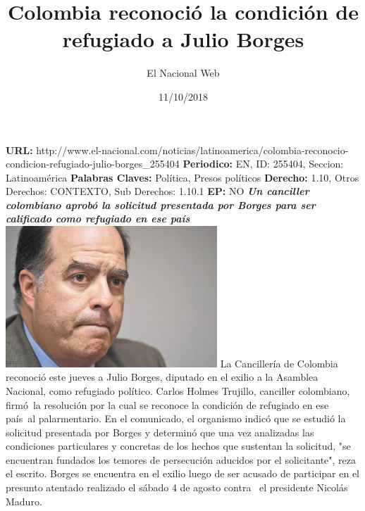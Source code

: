 \documentclass{article}%
\title{\textbf{Colombia reconoció la condición de refugiado a Julio Borges}}%
\author{El Nacional Web}%
\date{11/10/2018}%
\begin{document}
%
\normalsize%
\maketitle%
\textbf{URL: }%
http://www.el{-}nacional.com/noticias/latinoamerica/colombia{-}reconocio{-}condicion{-}refugiado{-}julio{-}borges\_255404\newline%
%
\textbf{Periodico: }%
EN, %
ID: %
255404, %
Seccion: %
Latinoamérica\newline%
%
\textbf{Palabras Claves: }%
Política, Presos políticos\newline%
%
\textbf{Derecho: }%
1.10, %
Otros Derechos: %
CONTEXTO, %
Sub Derechos: %
1.10.1\newline%
%
\textbf{EP: }%
NO\newline%
\newline%
%
\textbf{\textit{Un canciller colombiano aprobó la solicitud presentada por Borges para ser calificado como refugiado en ese país}}%
\newline%
\newline%
%
\includegraphics[width=300px]{199.jpg}%
\newline%
%
La Cancillería de Colombia reconoció este jueves a Julio Borges, diputado en el exilio a la Asamblea Nacional, como refugiado político.%
\newline%
%
Carlos Holmes Trujillo, canciller colombiano, firmó~la resolución por la cual se reconoce la condición de refugiado en ese país~al palarmentario.%
\newline%
%
En el comunicado, el organismo indicó que se estudió la solicitud presentada por Borges y determinó que una vez analizadas las condiciones particulares y concretas de los hechos que sustentan la solicitud, "se encuentran fundados los temores de persecución aducidos por el solicitante", reza el escrito.%
\newline%
%
Borges se encuentra en el exilio luego de ser acusado de participar en el presunto atentado realizado el sábado 4 de agosto contra~ el presidente Nicolás Maduro.%
\newline%
%
\end{document}
